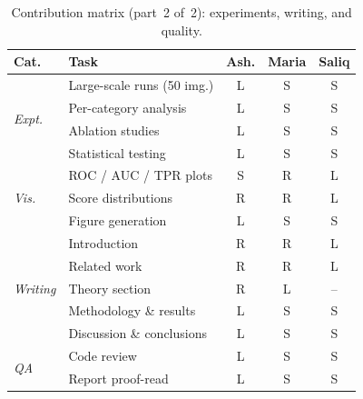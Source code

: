 \documentclass[10pt,twocolumn]{article}
\begin{document}
\begin{table}[htbp]
  \centering
  \caption{Contribution matrix (part~2 of~2): experiments, writing, and quality.}
  \label{tab:contributions_b}
  \footnotesize
  \setlength{\tabcolsep}{3pt}
  \begin{tabular}{lp{2.9cm}ccc}
    \toprule
    \textbf{Cat.} & \textbf{Task} & \textbf{Ash.} & \textbf{Maria} & \textbf{Saliq} \\
    \midrule
    \multirow{4}{*}{\textit{Expt.}}
      & Large-scale runs (50 img.) & L & S & S \\
      & Per-category analysis      & L & S & S \\
      & Ablation studies           & L & S & S \\
      & Statistical testing        & L & S & S \\[2pt]
    \multirow{3}{*}{\textit{Vis.}}
      & ROC / AUC / TPR plots      & S & R & L \\
      & Score distributions        & R & R & L \\
      & Figure generation          & L & S & S \\[2pt]
    \multirow{5}{*}{\textit{Writing}}
      & Introduction               & R & R & L \\
      & Related work               & R & R & L \\
      & Theory section             & R & L & -- \\
      & Methodology \& results     & L & S & S \\
      & Discussion \& conclusions  & L & S & S \\[2pt]
    \multirow{2}{*}{\textit{QA}}
      & Code review                & L & S & S \\
      & Report proof-read          & L & S & S \\
    \bottomrule
  \end{tabular}
\end{table}



\end{document}
